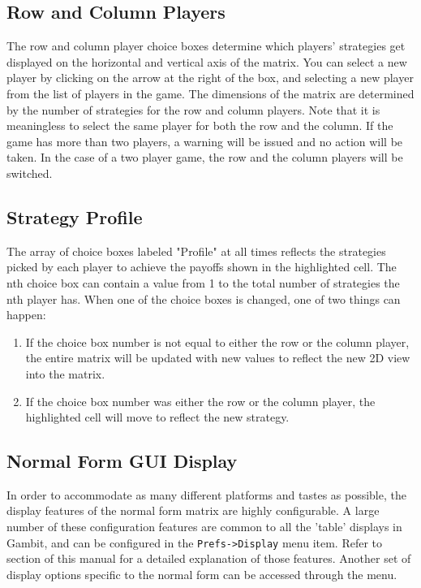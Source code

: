 \subsection{Row and Column Players} The row and column player choice boxes
determine which players' strategies get displayed on the horizontal and
vertical axis of the matrix.  You can select a new player by clicking on the 
arrow at the right of the box, and selecting a new player from the 
list of players in the game.  The dimensions of the matrix are
determined by the number of strategies for the row and column players.
Note that it is meaningless to select the same player for both the row and
the column.  If the game has more than two players, a warning will be
issued and no action will be taken.  In the case of a two player game, the
row and the column players will be switched.

\subsection{Strategy Profile}
The array of choice boxes labeled "Profile" at all times reflects the
strategies picked by each player to achieve the payoffs shown in the
highlighted cell.  The nth choice box can contain a value from 1 to the
total number of strategies the nth player has.  When one of the choice
boxes is changed, one of two things can happen:
\begin{enumerate}
\item If the choice box number is not equal to either the row or
the column player, the entire matrix will be updated with new values to
reflect the new 2D view into the matrix.
\item If the choice box number was either the row or the column player,
the highlighted cell will move to reflect the new strategy.
\end{enumerate}

\subsection{Normal Form GUI Display}
In order to accommodate as many different platforms and tastes as possible,
the display features of the normal form matrix are highly configurable.  A
large number of these configuration features are common to all the 'table'
displays in Gambit, and can be configured in the {\tt Prefs->Display} 
menu item.  Refer to  section
of this manual for a detailed explanation of those features.  Another set
of display options specific to the normal form can be accessed through the 
 menu.

